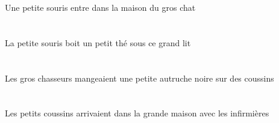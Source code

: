 \begin{exe}
Une petite souris entre dans la maison du gros chat
\ex\glll
\DEMSgObl{}   \grandDSg{}   \litDSgObl{}   \SOUS{}   \DEFSgErg{}   \petitASg{}   \sourisASgErg{}   \INDSgAbs{}   \petitBSg{}   \theBSgAbs{}  \boireVtPrsBSg{}\\
\DEMSgOblP{}   \grandDSgP{}   \litDSgOblP{}   \SOUSP{}   \DEFSgErgP{}   \petitASgP{}   \sourisASgErgP{}   \INDSgAbsP{}   \petitBSgP{}   \theBSgAbsP{}  \boireVtPrsBSgP{}\\
\DEMSgOblG{}   \grandDSgG{}   \litDSgOblG{}   \SOUSG{}   \DEFSgErgG{}   \petitASgG{}   \sourisASgErgG{}   \INDSgAbsG{}   \petitBSgG{}   \theBSgAbsG{}  \boireVtPrsBSgG{}\\
La petite souris boit un petit thé sous ce grand lit
\ex\glll
\INDPlObl{}   \coussinAPlObl{}   \SUR{}   \DEFPlErg{}   \grosCPl{}   \chasseurCPlErg{}   \INDSgAbs{}   \petitDSg{}   \noirDSg{}   \autrucheDSgAbs{}  \mangerVtPstDSg{}\\
\INDPlOblP{}   \coussinAPlOblP{}   \SURP{}   \DEFPlErgP{}   \grosCPlP{}   \chasseurCPlErgP{}   \INDSgAbsP{}   \petitDSgP{}   \noirDSgP{}   \autrucheDSgAbsP{}  \mangerVtPstDSgP{}\\
\INDPlOblG{}   \coussinAPlOblG{}   \SURG{}   \DEFPlErgG{}   \grosCPlG{}   \chasseurCPlErgG{}   \INDSgAbsG{}   \petitDSgG{}   \noirDSgG{}   \autrucheDSgAbsG{}  \mangerVtPstDSgG{}\\
Les gros chasseurs mangeaient une petite autruche noire sur des coussins
\ex\glll
\DEFPlObl{}   \infirmiereBPlObl{}   \AVEC{}   \DEFPlAbs{}   \petitAPl{}   \coussinAPlAbs{}    \DEFSgObl{}   \grandDSg{}   \maisonDSgObl{}   \DANS{}  \arriverViPstAPl{}\\
\DEFPlOblP{}   \infirmiereBPlOblP{}   \AVECP{}   \DEFPlAbsP{}   \petitAPlP{}   \coussinAPlAbsP{}    \DEFSgOblP{}   \grandDSgP{}   \maisonDSgOblP{}   \DANSP{}  \arriverViPstAPlP{}\\
\DEFPlOblG{}   \infirmiereBPlOblG{}   \AVECG{}   \DEFPlAbsG{}   \petitAPlG{}   \coussinAPlAbsG{}    \DEFSgOblG{}   \grandDSgG{}   \maisonDSgOblG{}   \DANSG{}  \arriverViPstAPlG{}\\
Les petits coussins arrivaient dans la grande maison avec les infirmières
\ex\glll
\DEFPlAbs{}   \grosCPl{}   \chasseurCPlAbs{}    \DEFPlObl{}   \grandCPl{}   \noirCPl{}   \tableCPlObl{}   \SOUS{}  \dormirViPrsCPl{}\\
\DEFPlAbsP{}   \grosCPlP{}   \chasseurCPlAbsP{}    \DEFPlOblP{}   \grandCPlP{}   \noirCPlP{}   \tableCPlOblP{}   \SOUSP{}  \dormirViPrsCPlP{}\\
\DEFPlAbsG{}   \grosCPlG{}   \chasseurCPlAbsG{}    \DEFPlOblG{}   \grandCPlG{}   \noirCPlG{}   \tableCPlOblG{}   \SOUSG{}  \dormirViPrsCPlG{}\\

\end{exe}
